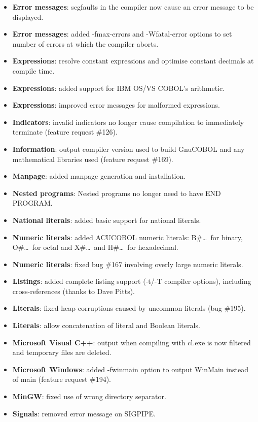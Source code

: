 \begin{itemize}
\item \textbf{Error messages}: segfaults in the compiler now cause an error message to be displayed.
\item \textbf{Error messages}: added -fmax-errors and -Wfatal-error options to set number of errors at which the compiler aborts.
\item \textbf{Expressions}: resolve constant expressions and optimise constant decimals at compile time.
\item \textbf{Expressions}: added support for IBM OS/VS COBOL's arithmetic.
\item \textbf{Expressions}: improved error messages for malformed expressions.
\item \textbf{Indicators}: invalid indicators no longer cause compilation to immediately terminate (feature request \#126).
\item \textbf{Information}: output compiler version used to build GnuCOBOL and any mathematical libraries used (feature request \#169).
\item \textbf{Manpage}: added manpage generation and installation.
\item \textbf{Nested programs}: Nested programs no longer need to have END PROGRAM.
\item \textbf{National literals}: added basic support for national literals.
\item \textbf{Numeric literals}: added ACUCOBOL numeric literals: B\#\ldots\, for binary, O\#\ldots\, for octal and X\#\ldots\, and H\#\ldots\, for hexadecimal.
\item \textbf{Numeric literals}: fixed bug \#167 involving overly large numeric literals.
\item \textbf{Listings}: added complete listing support (-t\slash{}-T compiler options), including cross-references (thanks to Dave Pitts).
\item \textbf{Literals}: fixed heap corruptions caused by uncommon literals (bug \#195).
\item \textbf{Literals}: allow concatenation of literal and Boolean literals.
\item \textbf{Microsoft Visual C++}: output when compiling with cl.exe is now filtered and temporary files are deleted.
\item \textbf{Microsoft Windows}: added -fwinmain option to output WinMain instead of main (feature request \#194).
\item \textbf{MinGW}: fixed use of wrong directory separator.
\item \textbf{Signals}: removed error message on SIGPIPE.

\end{itemize}
